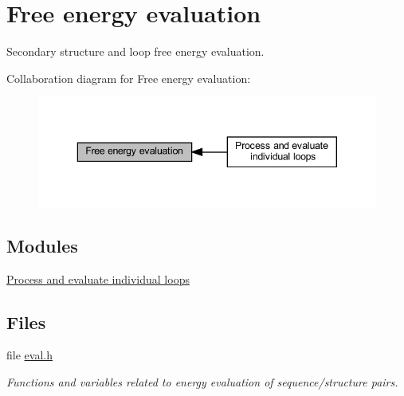 \hypertarget{group__eval}{}\section{Free energy evaluation}
\label{group__eval}


Secondary structure and loop free energy evaluation.  


Collaboration diagram for Free energy evaluation\+:
\nopagebreak
\begin{figure}[H]
\begin{center}
\leavevmode
\includegraphics[width=343pt]{group__eval}
\end{center}
\end{figure}
\subsection*{Modules}
\begin{DoxyCompactItemize}
\item 
\hyperlink{group__loops}{Process and evaluate individual loops}
\end{DoxyCompactItemize}
\subsection*{Files}
\begin{DoxyCompactItemize}
\item 
file \hyperlink{eval_8h}{eval.\+h}
\begin{DoxyCompactList}\small\item\em Functions and variables related to energy evaluation of sequence/structure pairs. \end{DoxyCompactList}\end{DoxyCompactItemize}
